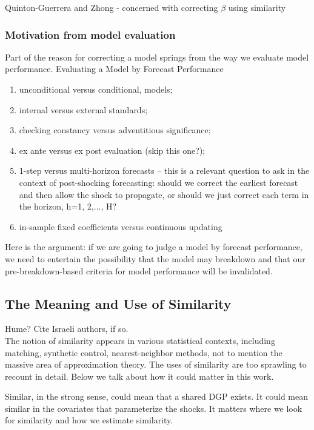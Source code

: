 \documentclass[11pt]{article}
\theoremstyle{definition}
\begin{document}
Quinton-Guerrera and Zhong \cite{guerron2017macroeconomic} - concerned with correcting $\beta$ using similarity\\

\subsubsection{Motivation from model evaluation}

Part of the reason for correcting a model springs from the way we evaluate model performance.
Evaluating a Model by Forecast Performance \cite{clements2005evaluating}
\begin{enumerate}

  \item   unconditional versus conditional, models;
  \item internal versus external standards;
  \item checking constancy versus adventitious significance;
  \item ex ante versus ex post evaluation (skip this one?);
  \item 1-step versus multi-horizon forecasts -- this is a relevant question to ask in the context of post-shocking forecasting: should we correct the earliest forecast and then allow the shock to propagate, or should we just correct each term in the horizon, h=1, 2,..., H?
  \item in-sample fixed coefficients versus continuous updating
\end{enumerate}

Here is the argument: if we are going to judge a model by forecast performance, we need to entertain the possibility that the model may breakdown and that our pre-breakdown-based criteria for model performance will be invalidated.

\subsection{The Meaning and Use of Similarity}\label{meaning_use}
Hume? Cite Israeli authors, if so.\\

The notion of similarity appears in various statistical contexts, including matching, synthetic control, nearest-neighbor methods, not to mention the massive area of approximation theory.  The uses of similarity are too sprawling to recount in detail.  Below we talk about how it could matter in this work.

Similar, in the strong sense, could mean that a shared DGP exists. It could mean similar in the covariates that parameterize the shocks.  It matters where we look for similarity and how we estimate similarity.
\end{document}
